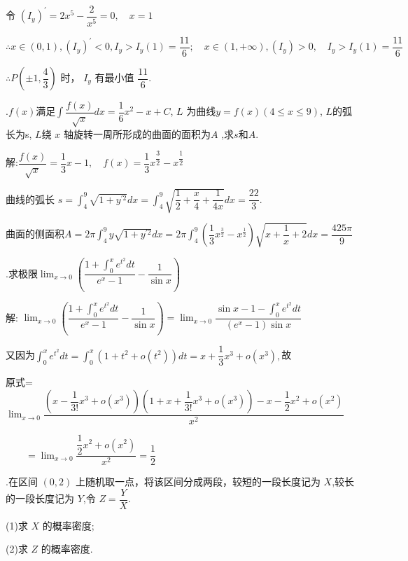 \documentclass{article}
\begin{document}
令 $\left(I_{y}\right)^{\prime}=2 x^{5}-\dfrac{2}{x^{5}}=0, \quad x=1$

$\therefore x \in(0,1),\left(I_{y}\right)^{\prime}<0, I_{y}>I_{y}(1)=\dfrac{11}{6} ; \quad x \in(1,+\infty),\left(I_{y}\right)>0, \quad I_{y}>I_{y}(1)=\dfrac{11}{6}$

$\therefore P\left(\pm 1, \dfrac{4}{3}\right)$ 时， $I_{y}$ 有最小值 $\dfrac{11}{6} .$

\vspace{1ex}
{.}$f(x)$满足$\int \dfrac{f(x)}{\sqrt{x}} d x=\dfrac{1}{6} x^{2}-x+C$, $L$ 为曲线$y=f(x)(4 \leq x \leq 9)$, $L$的弧长为s, $L$绕 $x$ 轴旋转一周所形成的曲面的面积为$A$ ,求$s$和$A$.

解:$\dfrac{f(x)}{\sqrt{x}}=\dfrac{1}{3} x-1, \quad f(x)=\dfrac{1}{3} x^{\dfrac{3}{2}}-x^{\dfrac{1}{2}}$

曲线的弧长 $ s=\int_{4}^{9} \sqrt{1+y^{\prime 2}} d x=\int_{4}^{9} \sqrt{\dfrac{1}{2}+\dfrac{x}{4}+\dfrac{1}{4 x}} d x=\dfrac{22}{3}.$

曲面的侧面积$A=2 \pi \int_{4}^{9} y \sqrt{1+y^{\prime 2}} d x=2 \pi \int_{4}^{9}\left(\dfrac{1}{3} x^{\frac{3}{2}}-x^{\frac{1}{2}}\right) \sqrt{x+\dfrac{1}{x}+2} d x =\dfrac{425 \pi}{9}$

\vspace{1ex}
{.}求极限$\lim _{x \rightarrow 0}\left(\dfrac{1+\int_{0}^{x} e^{t^{2}} d t}{e^{x}-1}-\dfrac{1}{\sin x}\right)$

解: $\lim _{x \rightarrow 0}\left(\dfrac{1+\int_{0}^{x} e^{t^{2}} d t}{e^{x}-1}-\dfrac{1}{\sin x}\right)=\lim _{x \rightarrow 0} \dfrac{\sin x-1-\int_{0}^{x} e^{t^{2}} d t}{\left(e^{x}-1\right) \sin x} $

又因为$\int_{0}^{x} e^{t^{2}} d t=\int_{0}^{x}\left(1+t^{2}+o\left(t^{2}\right)\right) d t=x+\dfrac{1}{3} x^{3}+o\left(x^{3}\right),$故

原式=$\lim _{x \rightarrow 0} \dfrac{\left(x-\dfrac{1}{3 !} x^{3}+o\left(x^{3}\right)\right)\left(1+x+\dfrac{1}{3 !} x^{3}+o\left(x^{3}\right)\right)-x-\dfrac{1}{2} x^{2}+o\left(x^{2}\right)}{x^{2}}$

$\qquad =\lim _{x \rightarrow 0} \dfrac{\dfrac{1}{2} x^{2}+o\left(x^{2}\right)}{x^{2}}=\dfrac{1}{2} $

\vspace{1ex}
{.}在区间 $(0,2)$ 上随机取一点，将该区间分成两段，较短的一段长度记为 $X$,较长的一段长度记为 $Y$,令 $Z=\dfrac{Y}{X}$.

(1)求 $X$ 的概率密度;

(2)求 $Z$ 的概率密度.
\end{document}
